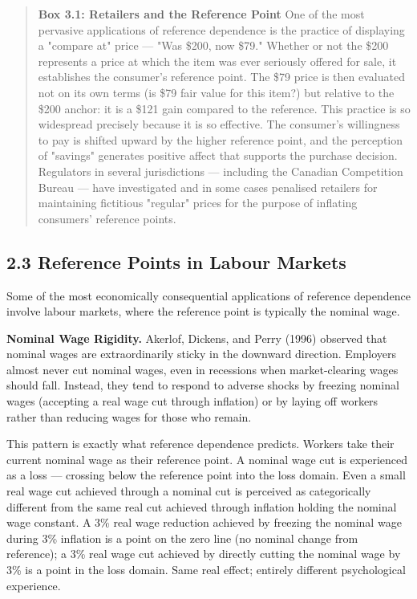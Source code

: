 \documentclass[12pt, letterpaper]{article}
\begin{document}
\begin{quote}
\textbf{Box 3.1: Retailers and the Reference Point}
One of the most pervasive applications of reference dependence is the practice of displaying a "compare at" price --- "Was \$200, now \$79." Whether or not the \$200 represents a price at which the item was ever seriously offered for sale, it establishes the consumer's reference point. The \$79 price is then evaluated not on its own terms (is \$79 fair value for this item?) but relative to the \$200 anchor: it is a \$121 gain compared to the reference.
This practice is so widespread precisely because it is so effective. The consumer's willingness to pay is shifted upward by the higher reference point, and the perception of "savings" generates positive affect that supports the purchase decision. Regulators in several jurisdictions --- including the Canadian Competition Bureau --- have investigated and in some cases penalised retailers for maintaining fictitious "regular" prices for the purpose of inflating consumers' reference points.
\end{quote}

\medskip


\subsection{2.3 Reference Points in Labour Markets}


Some of the most economically consequential applications of reference dependence involve labour markets, where the reference point is typically the nominal wage.

\textbf{Nominal Wage Rigidity.} Akerlof, Dickens, and Perry (1996) observed that nominal wages are extraordinarily sticky in the downward direction. Employers almost never cut nominal wages, even in recessions when market-clearing wages should fall. Instead, they tend to respond to adverse shocks by freezing nominal wages (accepting a real wage cut through inflation) or by laying off workers rather than reducing wages for those who remain.

This pattern is exactly what reference dependence predicts. Workers take their current nominal wage as their reference point. A nominal wage cut is experienced as a loss --- crossing below the reference point into the loss domain. Even a small real wage cut achieved through a nominal cut is perceived as categorically different from the same real cut achieved through inflation holding the nominal wage constant. A 3\% real wage reduction achieved by freezing the nominal wage during 3\% inflation is a point on the zero line (no nominal change from reference); a 3\% real wage cut achieved by directly cutting the nominal wage by 3\% is a point in the loss domain. Same real effect; entirely different psychological experience.
\end{document}
